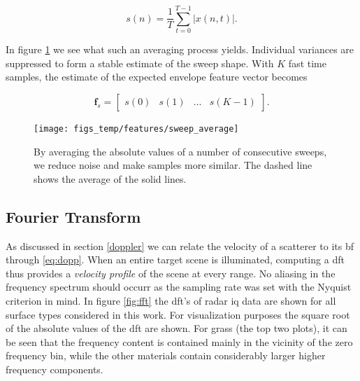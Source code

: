 \begin{equation}
	s(n) = \frac{1}{T}\sum_{t=0}^{T-1}|x(n, t)|.
\end{equation}

In figure \ref{fig:sweep_average} we see what such an averaging process yields. Individual variances are suppressed to form a stable estimate of the sweep shape. With $K$ fast time samples, the estimate of the expected envelope feature vector becomes 

\begin{equation}
	\mathbf{f}_{s} = 
	\begin{bmatrix}
		s(0) & s(1) & ... & s(K-1)
	\end{bmatrix}.
\end{equation}


\begin{figure}[h]
	\centering
	\texttt{[image: figs\_temp/features/sweep\_average]}
	\caption{By averaging the absolute values of a number of consecutive sweeps, we reduce noise and make samples more similar. The dashed line shows the average of the solid lines. }
	\label{fig:sweep_average}
\end{figure}


\subsection{Fourier Transform}

As discussed in section \ref{doppler} we can relate the velocity of a scatterer to its \gls{bf} through \ref{eq:dopp}. When an entire target scene is illuminated, computing a \gls{dft} thus provides a \emph{velocity profile} of the scene at every range. No aliasing in the frequency spectrum should occurr as the sampling rate was set with the Nyquist criterion in mind. In figure \ref{fig:fft} the \gls{dft}'s of radar \gls{iq} data are shown for all surface types considered in this work. For visualization purposes the square root of the absolute values of the \gls{dft} are shown. For grass (the top two plots), it can be seen that the frequency content is contained mainly in the vicinity of the zero frequency bin, while the other materials contain considerably larger higher frequency components. %


